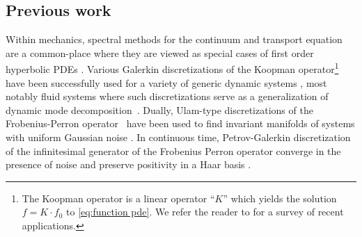 \documentclass[final,leqno]{siamltex1213}
\begin{document}
\subsection{Previous work}
Within mechanics, spectral methods for the continuum and transport equation are a common-place where they are viewed as special cases of first order hyperbolic PDEs \cite{Boyd2001,Gottlieb2001}.
Various Galerkin discretizations of the Koopman operator\footnote{The Koopman operator is a linear operator ``$K$'' which yields the solution $f = K \cdot f_{0}$ to \eqref{eq:function pde}. We refer the reader to \cite{BudisicMohrMezic2012} for a survey of recent applications.} have been successfully used for a variety of generic dynamic systems \cite{BudisicMohrMezic2012,Mezic2005}, most notably fluid systems \cite{Rowley2009} where such discretizations serve as a generalization of dynamic mode decomposition~\cite{Schmid2010}.
Dually, Ulam-type discretizations of the Frobenius-Perron operator~\cite{Ulam1947,LasotaMackey1994} have been used to find invariant manifolds of systems with uniform Gaussian noise \cite{FroylandJungeKoltai2013,FroylandPadberg2009}.
In continuous time, Petrov-Galerkin discretization of the infinitesimal generator of the Frobenius Perron operator converge in the presence of noise \cite{BittracherKoltaiJunge2015} and preserve positivity in a Haar basis \cite{koltai2011thesis}.
\end{document}
